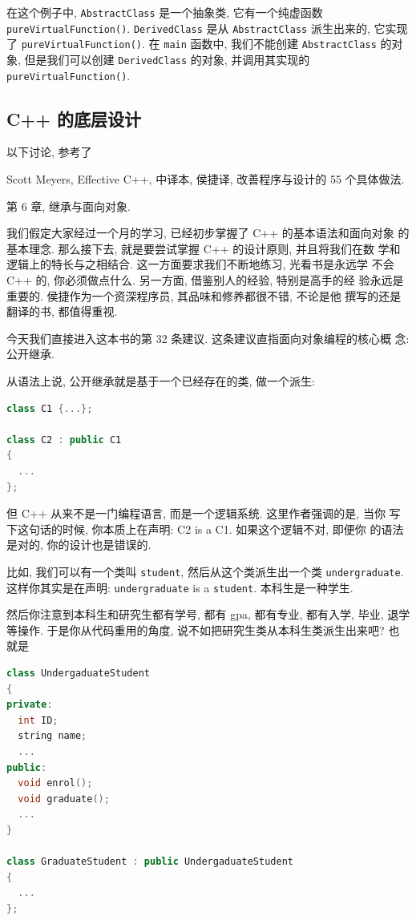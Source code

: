 \documentclass[a4paper]{ctexart}
\theoremstyle{definition}
\theoremstyle{definition}
\begin{document}
在这个例子中, \verb|AbstractClass| 是一个抽象类, 它有一个纯虚函数 \verb|pureVirtualFunction()|.
\verb|DerivedClass| 是从 \verb|AbstractClass| 派生出来的, 
它实现了 \verb|pureVirtualFunction()|. 在 \verb|main| 函数中, 
我们不能创建 \verb|AbstractClass| 的对象, 但是我们可以创建 \verb|DerivedClass| 的对象, 
并调用其实现的 \verb|pureVirtualFunction()|.

\subsection{C++ 的底层设计}

以下讨论, 参考了

Scott Meyers, Effective C++, 中译本, 侯捷译, 改善程序与设计的 55 个具体做法.

第 6 章, 继承与面向对象.

我们假定大家经过一个月的学习, 已经初步掌握了 C++ 的基本语法和面向对象
的基本理念. 那么接下去, 就是要尝试掌握 C++ 的设计原则, 并且将我们在数
学和逻辑上的特长与之相结合. 这一方面要求我们不断地练习, 光看书是永远学
不会 C++ 的, 你必须做点什么. 另一方面, 借鉴别人的经验, 特别是高手的经
验永远是重要的. 侯捷作为一个资深程序员, 其品味和修养都很不错, 不论是他
撰写的还是翻译的书, 都值得重视.

今天我们直接进入这本书的第 32 条建议. 这条建议直指面向对象编程的核心概
念: 公开继承.

从语法上说, 公开继承就是基于一个已经存在的类, 做一个派生:

\begin{lstlisting}[language=C++]
class C1 {...};

class C2 : public C1
{
  ...
};
\end{lstlisting}

但 C++ 从来不是一门编程语言, 而是一个逻辑系统. 这里作者强调的是, 当你
写下这句话的时候, 你本质上在声明: C2 is a C1. 如果这个逻辑不对, 即便你
的语法是对的, 你的设计也是错误的.

比如, 我们可以有一个类叫 \verb|student|, 然后从这个类派生出一个类
\verb|undergraduate|. 这样你其实是在声明: \verb|undergraduate| is a
\verb|student|. 本科生是一种学生.

然后你注意到本科生和研究生都有学号, 都有 gpa, 都有专业, 都有入学, 毕业,
退学等操作. 于是你从代码重用的角度, 说不如把研究生类从本科生类派生出来吧? 也就是

\begin{lstlisting}[language=C++]
class UndergaduateStudent
{
private:
  int ID;
  string name;
  ...
public:
  void enrol();
  void graduate();
  ...
} 
  
class GraduateStudent : public UndergaduateStudent
{
  ...
};
\end{lstlisting}
\end{document}
